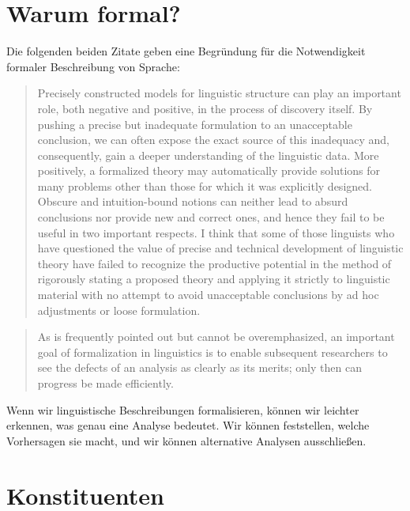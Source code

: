 \section{Warum formal?}
\label{sec-formal}

Die folgenden beiden Zitate geben eine Begründung für die Notwendigkeit
formaler Beschreibung von Sprache:  
\begin{quote}
Precisely constructed models for linguistic structure can play an
important role, both negative and positive, in the process of discovery 
itself. By pushing a precise but inadequate formulation to
an unacceptable conclusion, we can often expose the exact source
of this inadequacy and, consequently, gain a deeper understanding
of the linguistic data. More positively, a formalized theory may 
automatically provide solutions for many problems other than those
for which it was explicitly designed. Obscure and intuition-bound
notions can neither lead to absurd conclusions nor provide new and
correct ones, and hence they fail to be useful in two important respects. 
I think that some of those linguists who have questioned
the value of precise and technical development of linguistic theory
have failed to recognize the productive potential in the method
of rigorously stating a proposed theory and applying it strictly to
linguistic material with no attempt to avoid unacceptable conclusions 
by ad hoc adjustments or loose formulation.
\citep[]{Chomsky57a}
\end{quote}

\begin{quote}
As is frequently pointed out but cannot be overemphasized, an important goal
of formalization in linguistics is to enable subsequent researchers to see the defects
of an analysis as clearly as its merits; only then can progress be made efficiently.
\citep[]{Dowty79a}
\end{quote}
%
Wenn wir linguistische Beschreibungen formalisieren, können wir leichter
erkennen, was genau eine Analyse bedeutet. Wir können feststellen, welche
Vorhersagen sie macht, und wir können alternative Analysen ausschließen.




\section{Konstituenten}
\label{konstituententests}

